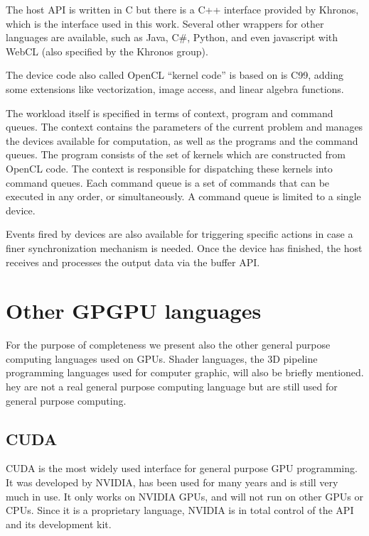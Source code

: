 The host \gls{API} is written in C but there is a C++ interface provided by Khronos, which is the interface used in this work. Several other wrappers for other languages are available, such as Java, C\#, Python, and even javascript with WebCL (also specified by the Khronos group). 

The device code also called \gls{OpenCL} ``kernel code'' is based on is C99, adding some extensions like vectorization, image access, and linear algebra functions.

The workload itself is specified in terms of context, program and command queues. The context contains the parameters of the current problem and manages the devices available for computation, as well as the programs and the command queues. The program consists of the set of kernels which are constructed from \gls{OpenCL} code. The context is responsible for dispatching these kernels into command queues. Each command queue is a set of commands that can be executed in any order, or simultaneously. A command queue is limited to a single device.\cite{OpenCLInAction,OpenCLProgrammingGuide}

Events fired by devices are also available for triggering specific actions in case a finer synchronization mechanism is needed. Once the device has finished, the host receives and processes the output data via the buffer \gls{API}.

\section{Other GPGPU languages}

For the purpose of completeness we present also the other general purpose computing languages used on \glspl{GPU}. Shader languages, the 3D pipeline programming languages used for computer graphic, will also be briefly mentioned. hey are not a real general purpose computing language but are still used for general purpose computing.

\subsection{CUDA}

\Gls{CUDA} is the most widely used interface for general purpose \gls{GPU} programming. It was developed by NVIDIA, has been used for many years and is still very much in use. It only works on NVIDIA \glspl{GPU}, and will not run on other \glspl{GPU} or \glspl{CPU}. Since it is a proprietary language, NVIDIA is in total control of the API and its development kit.

